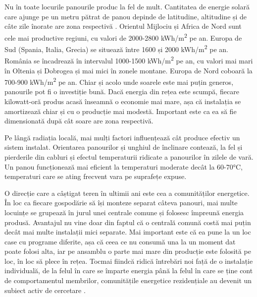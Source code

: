 \documentclass[12pt,a4paper]{report}
\begin{document}
Nu în toate locurile panourile produc la fel de mult. Cantitatea de energie solară care ajunge pe un metru pătrat de panou depinde de latitudine, altitudine și de câte zile înorate are zona respectivă \cite{globalsolaratlas2020}. Orientul Mijlociu și Africa de Nord sunt cele mai productive regiuni, cu valori de 2000-2800 kWh/m\textsuperscript{2} pe an. Europa de Sud (Spania, Italia, Grecia) se situează între 1600 și 2000 kWh/m\textsuperscript{2} pe an. România se încadrează în intervalul 1000-1500 kWh/m\textsuperscript{2} pe an, cu valori mai mari în Oltenia și Dobrogea și mai mici în zonele montane. Europa de Nord coboară la 700-900 kWh/m\textsuperscript{2} pe an. Chiar și acolo unde soarele este mai puțin generos, panourile pot fi o investiție bună. Dacă energia din rețea este scumpă, fiecare kilowatt-oră produs acasă înseamnă o economie mai mare, așa că instalația se amortizează chiar și cu o producție mai modestă. Important este ca ea să fie dimensionată după cât soare are zona respectivă.

Pe lângă radiația locală, mai mulți factori influențează cât produce efectiv un sistem instalat. Orientarea panourilor și unghiul de înclinare contează, la fel și pierderile din cabluri și efectul temperaturii ridicate a panourilor în zilele de vară. Un panou funcționează mai eficient la temperaturi moderate decât la 60-70°C, temperaturi care se ating frecvent vara pe suprafețe expuse.

O direcție care a câștigat teren în ultimii ani este cea a comunităților energetice. În loc ca fiecare gospodărie să își monteze separat câteva panouri, mai multe locuințe se grupează în jurul unei centrale comune și folosesc împreună energia produsă. Avantajul nu vine doar din faptul că o centrală comună costă mai puțin decât mai multe instalații mici separate. Mai important este că ea pune la un loc case cu programe diferite, așa că ceea ce nu consumă una la un moment dat poate folosi alta, iar pe ansamblu o parte mai mare din producție este folosită pe loc, în loc să plece în rețea. Tocmai fiindcă ridică întrebări noi față de o instalație individuală, de la felul în care se împarte energia până la felul în care se ține cont de comportamentul membrilor, comunitățile energetice rezidențiale au devenit un subiect activ de cercetare \cite{barabino2023energycommunities, simoiu2022aqtr}.
\end{document}
